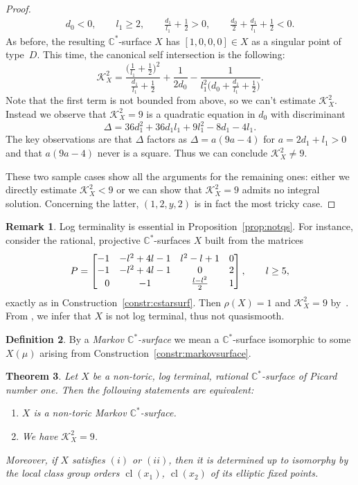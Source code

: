 \documentclass[10pt,a4paper]{amsart}
\newtheorem{thm}{Theorem}[section]
\theoremstyle{definition}
\newtheorem{defi}[thm]{Definition}
\newtheorem{rem}[thm]{Remark}
\def\CC{{\mathbb C}}
\DeclareMathOperator{\cl}{cl}
\begin{document}
\begin{proof}
\begin{gather*}
d_0 < 0, \qquad l_1 \ge 2, \qquad \frac{d_1}{l_1}+\frac{1}{2} > 0, \qquad \frac{d_0}{2}+\frac{d_1}{l_1}+\frac{1}{2} < 0.
\end{gather*}
As before, the resulting $\CC^*$-surface $X$
has $[1,0,0,0] \in X$ as a singular point
of type~$D$.
This time, the canonical self intersection
is the following:
\[
\mathcal{K}_X^2
 =
\frac{\bigl(\frac{1}{l_1}+\frac{1}{2}\bigr)^2}{\frac{d_1}{l_1}+\frac{1}{2}}
 +
\frac{1}{2d_0}
 -
\frac{1}{l_1^2\bigl(d_0+\frac{d_1}{l_1}+\frac{1}{2}\bigr)}.
\]
Note that the first term is not bounded from above,
so we can't estimate $\mathcal{K}_X^2$.
Instead we observe that $\mathcal{K}_X^2=9$ is a
quadratic equation in $d_0$ with discriminant
\[
\Delta
 =
36d_1^2 + 36d_1l_1 + 9l_1^2 - 8d_1 - 4l_1.
\]
The key observations are that $\Delta$ factors as
$\Delta = a(9a-4)$ for $a=2d_1+l_1>0$ and
that $a(9a-4)$ never is a square.
Thus we can conclude $\mathcal{K}_X^2 \ne 9$.

These two sample cases show all the arguments
for the remaining ones: either we directly
estimate $\mathcal{K}_X^2 < 9$ or we can
show that $\mathcal{K}_X^2 = 9$ admits no
integral solution.
Concerning the latter, $(1,2,y,2)$ is in fact
the most tricky case.
\end{proof}


\begin{rem}
Log terminality is essential in Proposition~\ref{prop:notqs}.
For instance, consider the rational, projective
$\CC^*$-surfaces $X$ built from the matrices
\[
P
 =
\begin{bmatrix}
-1 & -l^2 + 4l - 1 & l^2 - l + 1 & 0
\\
-1 & -l^2 + 4l - 1 & 0 & 2
\\
\hphantom{-} 0 & -1 & \frac{l-l^2}{2} & 1
\end{bmatrix},
\qquad l \ge 5,
\]
exactly as in Construction~\ref{constr:cstarsurf}.
Then $\rho(X)=1$ and $\mathcal{K}_X^2=9$ by~\cite[Proposition~6.9]{HaHaSp}.
From \mbox{\cite[Corollary~8.12]{HaHaSp}}, we infer that $X$ is
not log terminal, thus not quasismooth.
\end{rem}



\begin{defi}
By a \emph{Markov $\CC^*$-surface} we mean
a $\CC^*$-surface isomorphic to some $X(\mu)$
arising from Construction~\ref{constr:markovsurface}.
\end{defi}



\begin{thm}
\label{thm:markovsurfchar}
Let $X$ be a non-toric, log terminal,
rational $\CC^*$-surface of Picard number one.
Then the following statements are equivalent:
\begin{enumerate}\itemsep=0pt
\item[$(i)$]
$X$ is a non-toric Markov $\CC^*$-surface.
\item[$(ii)$]
We have $\mathcal{K}_X^2 = 9$.
\end{enumerate}
Moreover, if $X$ satisfies $(i)$ or $(ii)$, then it is
determined up to isomorphy by the local class group
orders $\cl(x_1)$, $\cl(x_2)$ of its elliptic fixed points.
\end{thm}
\end{document}
